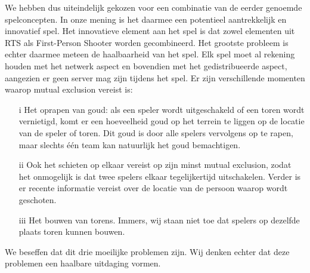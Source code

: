 We hebben dus uiteindelijk gekozen voor een combinatie van de eerder genoemde spelconcepten. In onze mening is het daarmee een potentieel aantrekkelijk en innovatief spel. Het innovatieve element aan het spel is dat zowel elementen uit RTS als First-Person Shooter worden gecombineerd. Het grootste probleem is echter daarmee meteen de haalbaarheid van het spel. Elk spel moet al rekening houden met het netwerk aspect en bovendien met het gedistribueerde aspect, aangezien er geen server mag zijn tijdens het spel. Er zijn verschillende momenten waarop mutual exclusion vereist is:

\begin{enumerate}
\item[i] Het oprapen van goud: als een speler wordt uitgeschakeld of een toren wordt vernietigd, komt er een hoeveelheid goud op het terrein te liggen op de locatie van de speler of toren. Dit goud is door alle spelers vervolgens op te rapen, maar slechts \'e\'en team kan natuurlijk het goud bemachtigen.
\item[ii] Ook het schieten op elkaar vereist op zijn minst mutual exclusion, zodat het onmogelijk is dat twee spelers elkaar tegelijkertijd uitschakelen. Verder is er recente informatie vereist over de locatie van de persoon waarop wordt geschoten.
\item[iii] Het bouwen van torens. Immers, wij staan niet toe dat spelers op dezelfde plaats toren kunnen bouwen.
\end{enumerate}

We beseffen dat dit drie moeilijke problemen zijn. Wij denken echter dat deze problemen een haalbare uitdaging vormen.